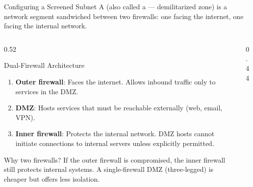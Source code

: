 \documentclass[aspectratio=169]{beamer}  %
\begin{document}
\begin{frame}{Configuring a Screened Subnet}
    \footnotesize
    A  (also called a  --- demilitarized zone) is a network segment sandwiched between two firewalls: one facing the internet, one facing the internal network.

    \vspace{0.3em}
    \begin{columns}[T]
        \begin{column}{0.52\textwidth}
            \begin{block}{Dual-Firewall Architecture}
                \footnotesize
                \begin{enumerate}
                    \item \textbf{Outer firewall}: Faces the internet. Allows inbound traffic only to services in the DMZ.
                    \item \textbf{DMZ}: Hosts services that must be reachable externally (web, email, VPN).
                    \item \textbf{Inner firewall}: Protects the internal network. DMZ hosts cannot initiate connections to internal servers unless explicitly permitted.
                \end{enumerate}
            \end{block}
            \begin{alertblock}{Why two firewalls?}
                \footnotesize
                If the outer firewall is compromised, the inner firewall still protects internal systems. A single-firewall DMZ (three-legged) is cheaper but offers less isolation.
            \end{alertblock}
        \end{column}
        \begin{column}{0.44\textwidth}
            \begin{center}
\end{center}
\end{column}
\end{columns}
\end{frame}
\end{document}
